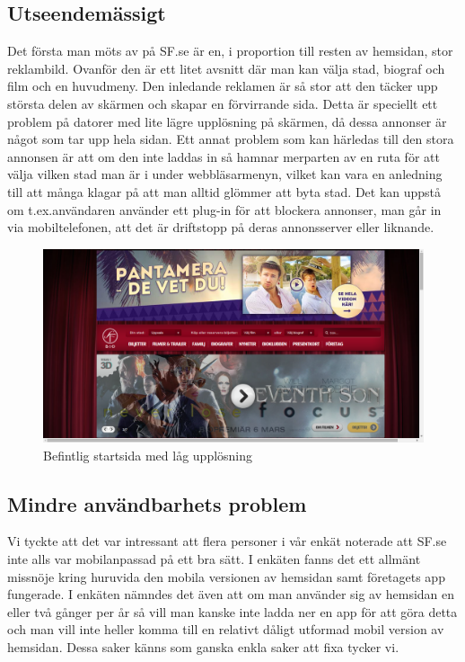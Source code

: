 \documentclass[swedish,a4paper,11pt]{article}
\begin{document}
\subsection{Utseendemässigt} 
Det första man möts av på SF.se är en, i proportion till resten av hemsidan, stor reklambild. Ovanför den är ett litet avsnitt där man kan välja stad, biograf och film och en huvudmeny. Den inledande reklamen är så stor att den täcker upp största delen av skärmen och skapar en förvirrande sida. Detta är speciellt ett problem på datorer med lite lägre upplösning på skärmen, då dessa annonser är något som tar upp hela sidan. Ett annat problem som kan härledas till den stora annonsen är att om den inte laddas in  så hamnar merparten av en ruta för att välja vilken stad man är i under webbläsarmenyn, vilket kan vara en anledning till att många klagar på att man alltid glömmer att byta stad. Det kan uppstå om t.ex.användaren använder ett plug-in för att blockera annonser, man går in via mobiltelefonen, att det är driftstopp på deras annonsserver eller liknande.

\noindent

\begin{figure}[H]
\centering
\includegraphics[scale=0.27]{StartsidaLow.png} 
\caption{Befintlig startsida med låg upplösning}
\end{figure}

\subsection{Mindre användbarhets problem} 
Vi tyckte att det var intressant att flera personer i vår enkät noterade att SF.se inte alls var mobilanpassad på ett bra sätt. I enkäten fanns det ett allmänt missnöje kring huruvida den mobila versionen av hemsidan samt företagets app fungerade. I enkäten nämndes det även att om man använder sig av hemsidan en eller två gånger per år så vill man kanske inte ladda ner en app för att göra detta och man vill inte heller komma till en relativt dåligt utformad mobil version av hemsidan. Dessa saker känns som ganska enkla saker att fixa tycker vi.
\end{document}
